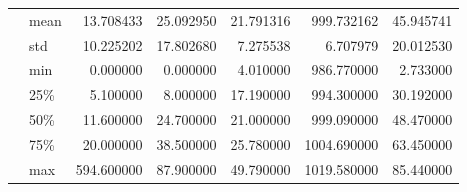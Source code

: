 \begin{tabular}{llrrrrr}
  & mean &      13.708433 &      25.092950 &      21.791316 &     999.732162 &      45.945741 \\
  & std &      10.225202 &      17.802680 &       7.275538 &       6.707979 &      20.012530 \\
  & min &       0.000000 &       0.000000 &       4.010000 &     986.770000 &       2.733000 \\
  & 25\% &       5.100000 &       8.000000 &      17.190000 &     994.300000 &      30.192000 \\
  & 50\% &      11.600000 &      24.700000 &      21.000000 &     999.090000 &      48.470000 \\
  & 75\% &      20.000000 &      38.500000 &      25.780000 &    1004.690000 &      63.450000 \\
  & max &     594.600000 &      87.900000 &      49.790000 &    1019.580000 &      85.440000 \\
\bottomrule
\end{tabular}
